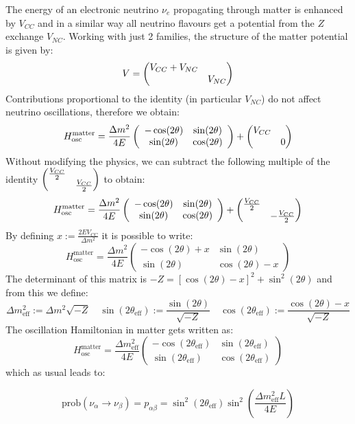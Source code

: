 \documentclass[10.75pt,a4paper,openright,bottom=2cm]{article}
\newcommand{\beginbox}[1]{\begin{tcolorbox}[width=\textwidth,colback={black!40},title={#1},colbacktitle={purple!55},coltitle=black]}
\renewcommand{\endbox}{\end{tcolorbox}\noindent}
\begin{document}
The energy of an electronic neutrino $\nu_e$ propagating through matter is enhanced by $V_{CC}$ and in a similar way all neutrino flavours get a potential from the $Z$ exchange $V_{NC}$. Working with just 2 families, the structure of the matter potential is given by:
\[
V=\mqty(\dmat{V_{CC}+V_{NC},V_{NC}})
\]
Contributions proportional to the identity (in particular $V_{NC}$) do not affect neutrino oscillations, therefore we obtain:
\[
H_{\text{osc}}^{\text{matter}}=\frac{\Delta m^2}{4E}\left(\begin{array}{cc}
    -\cos(2\theta) & \sin(2\theta) \\
    \sin(2\theta) & \cos(2\theta)
\end{array}\right)+\mqty(\dmat{V_{CC},0})
\]
Without modifying the physics, we can subtract the following multiple of the identity $\mqty(\dmat{\frac{V_{CC}}{2},\frac{V_{CC}}{2}})$ to obtain:
\[
H_{\text{osc}}^{\text{matter}}=\frac{\Delta m^2}{4E}\left(\begin{array}{cc}
    -\cos(2\theta) & \sin(2\theta) \\
    \sin(2\theta) & \cos(2\theta)
\end{array}\right)+\mqty(\dmat{\frac{V_{CC}}{2},-\frac{V_{CC}}{2}})
\]
By defining $x:=\frac{2EV_{CC}}{\Delta m^2}$ it is possible to write:
\[
H_{\text{osc}}^{\text{matter}}=\frac{\Delta m^2}{4E}\left(\begin{array}{cc}
    -\cos(2\theta)+x & \sin(2\theta) \\
    \sin(2\theta) & \cos(2\theta)-x
\end{array}\right)
\]
The determinant of this matrix is $-Z=[\cos(2\theta)-x]^2+\sin^2(2\theta)$ and from this we define:
\[
\Delta m^2_{\text{eff}}:=\Delta m^2\sqrt{-Z} \quad \sin(2\theta_{\text{eff}}):=\frac{\sin(2\theta)}{\sqrt{-Z}} \quad \cos(2\theta_{\text{eff}}):=\frac{\cos(2\theta)-x}{\sqrt{-Z}}
\]
The oscillation Hamiltonian in matter gets written as:
\[
H_{\text{osc}}^{\text{matter}}=\frac{\Delta m^2_{\text{eff}}}{4E}\left(\begin{array}{cc}
    -\cos(2\theta_{\text{eff}}) & \sin(2\theta_{\text{eff}}) \\
    \sin(2\theta_{\text{eff}}) & \cos(2\theta_{\text{eff}})
\end{array}\right)
\]
which as usual leads to:
\beginbox{Oscillation Probability in Matter}
\[
\text{prob}(\nu_\alpha\to\nu_\beta)=p_{\alpha\beta}=\sin^2(2\theta_{\text{eff}})\sin^2\left(\frac{\Delta m^2_{\text{eff}}L}{4E}\right)
\]
\endbox
\end{document}
